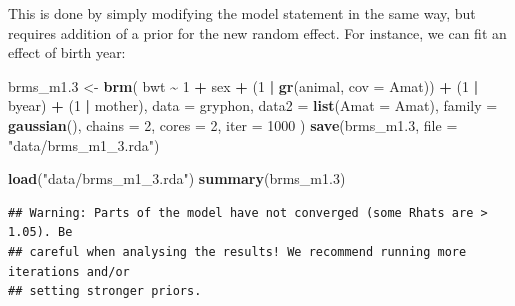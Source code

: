 \documentclass[
  12pt,
]{book}
\newenvironment{Shaded}{\begin{snugshade}}{\end{snugshade}}
\newcommand{\DataTypeTok}[1]{\textcolor[rgb]{0.13,0.29,0.53}{#1}}
\newcommand{\DecValTok}[1]{\textcolor[rgb]{0.00,0.00,0.81}{#1}}
\newcommand{\FloatTok}[1]{\textcolor[rgb]{0.00,0.00,0.81}{#1}}
\newcommand{\KeywordTok}[1]{\textcolor[rgb]{0.13,0.29,0.53}{\textbf{#1}}}
\newcommand{\NormalTok}[1]{#1}
\newcommand{\OperatorTok}[1]{\textcolor[rgb]{0.81,0.36,0.00}{\textbf{#1}}}
\newcommand{\StringTok}[1]{\textcolor[rgb]{0.31,0.60,0.02}{#1}}
\begin{document}
This is done by simply modifying the model statement in the same way, but requires addition of a prior for the new random effect. For instance, we can fit an effect of birth year:

\begin{Shaded}
\begin{Highlighting}[]
\NormalTok{brms\_m1}\FloatTok{.3}\NormalTok{ \textless{}{-}}\StringTok{ }\KeywordTok{brm}\NormalTok{(}
\NormalTok{  bwt }\OperatorTok{\textasciitilde{}}\StringTok{ }\DecValTok{1} \OperatorTok{+}\StringTok{ }\NormalTok{sex }\OperatorTok{+}\StringTok{ }\NormalTok{(}\DecValTok{1} \OperatorTok{|}\StringTok{ }\KeywordTok{gr}\NormalTok{(animal, }\DataTypeTok{cov =}\NormalTok{ Amat)) }\OperatorTok{+}\StringTok{ }\NormalTok{(}\DecValTok{1} \OperatorTok{|}\StringTok{ }\NormalTok{byear) }\OperatorTok{+}\StringTok{ }\NormalTok{(}\DecValTok{1} \OperatorTok{|}\StringTok{ }\NormalTok{mother),}
  \DataTypeTok{data =}\NormalTok{ gryphon,}
  \DataTypeTok{data2 =} \KeywordTok{list}\NormalTok{(}\DataTypeTok{Amat =}\NormalTok{ Amat),}
  \DataTypeTok{family =} \KeywordTok{gaussian}\NormalTok{(),}
  \DataTypeTok{chains =} \DecValTok{2}\NormalTok{, }\DataTypeTok{cores =} \DecValTok{2}\NormalTok{, }\DataTypeTok{iter =} \DecValTok{1000}
\NormalTok{)}
\KeywordTok{save}\NormalTok{(brms\_m1}\FloatTok{.3}\NormalTok{, }\DataTypeTok{file =} \StringTok{"data/brms\_m1\_3.rda"}\NormalTok{)}
\end{Highlighting}
\end{Shaded}

\begin{Shaded}
\begin{Highlighting}[]
\KeywordTok{load}\NormalTok{(}\StringTok{"data/brms\_m1\_3.rda"}\NormalTok{)}
\KeywordTok{summary}\NormalTok{(brms\_m1}\FloatTok{.3}\NormalTok{)}
\end{Highlighting}
\end{Shaded}

\begin{verbatim}
## Warning: Parts of the model have not converged (some Rhats are > 1.05). Be
## careful when analysing the results! We recommend running more iterations and/or
## setting stronger priors.
\end{verbatim}
\end{document}
